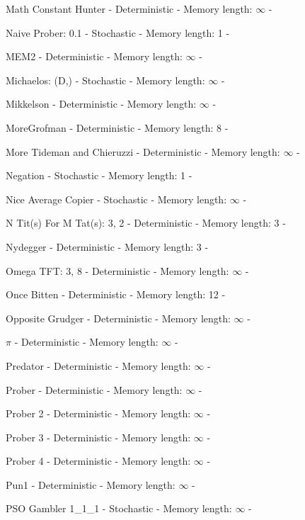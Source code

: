 \item Math Constant Hunter - Deterministic - Memory length: \(\infty\) - \cite{Knight2018}
\item Naive Prober: 0.1 - Stochastic - Memory length: 1 - \cite{Li2011}
\item MEM2 - Deterministic - Memory length: \(\infty\) - \cite{Li2014}
\item Michaelos: (D,) - Stochastic - Memory length: \(\infty\) - \cite{LessWrong2011}
\item Mikkelson - Deterministic - Memory length: \(\infty\) - \cite{Axelrod1980b}
\item MoreGrofman - Deterministic - Memory length: 8 - \cite{Axelrod1980b}
\item More Tideman and Chieruzzi - Deterministic - Memory length: \(\infty\) - \cite{Axelrod1980b}
\item Negation - Stochastic - Memory length: 1 - \cite{PD2017}
\item Nice Average Copier - Stochastic - Memory length: \(\infty\) - \cite{Knight2018}
\item N Tit(s) For M Tat(s): 3, 2 - Deterministic - Memory length: 3 - \cite{Knight2018}
\item Nydegger - Deterministic - Memory length: 3 - \cite{Axelrod1980}
\item Omega TFT: 3, 8 - Deterministic - Memory length: \(\infty\) - \cite{Slany2007}
\item Once Bitten - Deterministic - Memory length: 12 - \cite{Knight2018}
\item Opposite Grudger - Deterministic - Memory length: \(\infty\) - \cite{Knight2018}
\item $\pi$ - Deterministic - Memory length: \(\infty\) - \cite{Knight2018}
\item Predator - Deterministic - Memory length: \(\infty\) - \cite{Ashlock2006b}
\item Prober - Deterministic - Memory length: \(\infty\) - \cite{Li2011}
\item Prober 2 - Deterministic - Memory length: \(\infty\) - \cite{Prison1998}
\item Prober 3 - Deterministic - Memory length: \(\infty\) - \cite{Prison1998}
\item Prober 4 - Deterministic - Memory length: \(\infty\) - \cite{Prison1998}
\item Pun1 - Deterministic - Memory length: \(\infty\) - \cite{Ashlock2006}
\item PSO Gambler 1\_1\_1 - Stochastic - Memory length: \(\infty\) - \cite{Knight2018}

